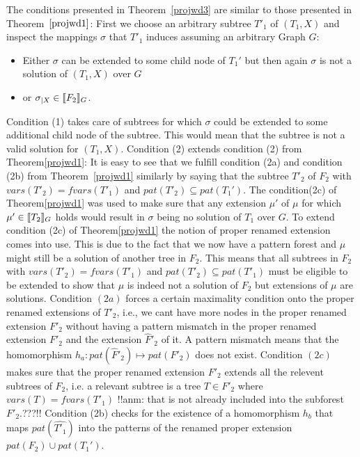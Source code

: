 \begin{proofidea}
 The conditions presented in Theorem~\ref{projwd3} are similar to those presented in
 Theorem~$\ref{projwd1}$: First we choose an arbitrary subtree $T'_1$ of $(T_1,X)$ and
 inspect the mappings $\sigma$ that $T'_1$ induces assuming an arbitrary Graph
 $G$: 
 \begin{itemize}
	 \item Either $\sigma$ can be extended to some child node of $T_1'$ but then
 again $\sigma$ is not a solution of $(T_1,X)$ over $G$
	 \item  or $\sigma_{|X} \in \llbracket F_2\rrbracket_G$.
\end{itemize}
Condition (1) takes care of subtrees for which $\sigma$ could be extended
to some additional child node of the subtree. This would mean that the subtree
is not a valid solution for $(T_1,X)$.
Condition (2) extends condition (2) from Theorem\ref{projwd1}:
It is easy to see that we fulfill condition (2a) and condition (2b)
from Theorem~\ref{projwd1} similarly by saying that the subtree $T'_2$ of $F_2$
with $vars(T'_2) = fvars(T'_1)$ and $pat(T'_2) \subseteq pat(T_1')$.  
The condition(2c) of Theorem\ref{projwd1} was used to make sure
that any extension $\mu'$ of $\mu$ for which $\mu' \in \llbracket T_2\rrbracket_G$ holds would
result in $\sigma$ being no solution of $T_1$ over $G$. To extend
condition (2c) of Theorem\ref{projwd1} the notion of proper renamed extension
comes into use. This is due to the fact that we now have a pattern forest and
$\mu$ might still be a solution of another tree in $F_2$. This means that all
subtrees in $F_2$ with $vars(T'_2) = fvars(T'_1)$ and $pat(T'_2) \subseteq
pat(T'_1)$ must be eligible to be extended to show that $\mu$ is indeed not a
solution of $F_2$ but extensions of $\mu$ are solutions.
Condition $(2a)$ forces a certain maximality condition onto the proper renamed
extensions of $T'_2$, i.e., we cant have more nodes in the proper renamed
extension $F'_2$ without having a pattern mismatch in the proper renamed
extension $F'_2$ and
the extension $\hat{F}'_2$ of it. A pattern mismatch means that the homomorphism $h_a:
pat(\hat{F}'_2) \mapsto pat(F'_2)$ does not exist.
Condition $(2c)$ makes sure that the proper renamed extension $F'_2$
extends all the relevent subtrees of $F_2$, i.e. a relevant subtree is a tree $T
\in F'_2$ where $vars(T)  =fvars(T'_1)$ !!anm: that is not already included into
the subforest $F'_2$.???!!
Condition (2b) checks for the existence of a homomorphism $h_b$ that maps
$pat(\hat{T'_1})$ into the patterns of the renamed proper extension $pat(F_2)
\cup pat(T_1')$.

\end{proofidea}


